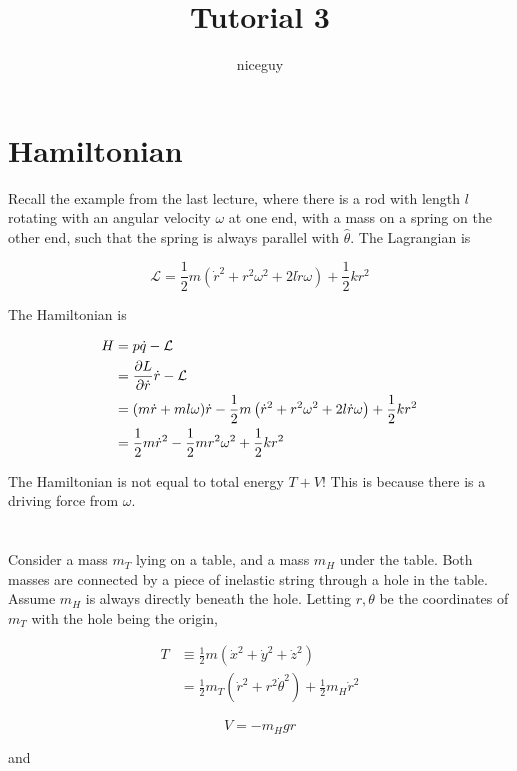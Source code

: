 \documentclass[12pt]{article}
\title{Tutorial 3}
\author{niceguy}
\begin{document}
\maketitle

\section{Hamiltonian}

Recall the example from the last lecture, where there is a rod with length $l$ rotating with an angular velocity $\omega$ at one end, with a mass on a spring on the other end, such that the spring is always parallel with $\hat\theta$. The Lagrangian is

$$\mathcal L = \frac{1}{2}m\left(\dot r^2 + r^2\omega^2 + 2l\dot r\omega\right) + \frac{1}{2} kr^2$$

The Hamiltonian is

\begin{align*}
    H &= p\dot q - \mathcal L \\
      &= \frac{\partial L}{\partial \dot r}\dot r - \mathcal L \\
      &= (m\dot r + ml\omega)\dot r - \frac{1}{2}m\left(\dot r^2 + r^2\omega^2 + 2l\dot r\omega\right) + \frac{1}{2} kr^2 \\
      &= \frac{1}{2} m\dot r^2 - \frac{1}{2} mr^2\omega^2 + \frac{1}{2}kr^2
\end{align*}

The Hamiltonian is not equal to total energy $T + V$! This is because there is a driving force from $\omega$.

\section{}

Consider a mass $m_T$ lying on a table, and a mass $m_H$ under the table. Both masses are connected by a piece of inelastic string through a hole in the table. Assume $m_H$ is always directly beneath the hole. Letting $r,\theta$ be the coordinates of $m_T$ with the hole being the origin,

\begin{align*}
    T &\equiv \frac{1}{2}m(\dot x^2 + \dot y^2 + \dot z^2) \\
      &= \frac{1}{2}m_T (\dot r^2 + r^2\dot\theta^2) + \frac{1}{2}m_H\dot r^2
\end{align*}

$$V = -m_Hgr$$

and
\end{document}
